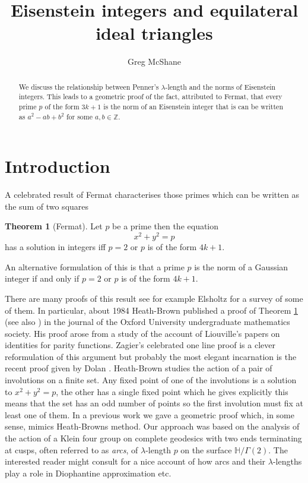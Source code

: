 \documentclass[12pt]{amsart}
\title{Eisenstein integers and equilateral ideal triangles}
\author[McShane]{Greg McShane}
\theoremstyle{plain}
\theoremstyle{definition}
\newtheorem{thm}{Theorem}[section]
\def\HH{\mathbb{H}}
\def\xx{\HH/g2}
\def\ZZ{\mathbb{Z}}
\def\g2{\Gamma(2)}
\def\xx{\HH/\g2}
\begin{document}
\maketitle

\begin{abstract} 
We discuss the relationship between Penner's $\lambda$-length
and the norms of Eisenstein integers. This leads to a geometric
proof of the fact, attributed to Fermat, that every prime $p$ of the form $3k + 1$
is the norm of an Eisenstein integer that is can be written
as $a^2 - ab + b^2$ for some $a,b \in \ZZ$.
\end{abstract} 



\section{Introduction}


A celebrated result of Fermat characterises
those primes which can be written as the sum of two squares

\begin{thm}[Fermat]\label{main}
Let $p$ be a prime then the equation
$$x^2 + y^2 = p $$
has a solution in integers  iff  $p =2$ or $p$ is of the form $4k + 1$.
\end{thm}

An alternative formulation of this  is that
a prime $p$ is the norm of a Gaussian integer
if and only if $p =2$ or $p$ is of the form $4k + 1$.

There are many proofs of this result see for example Elsholtz
\cite{elsholtz} for a survey of some of them.
In particular, about  1984 Heath-Brown published a proof of Theorem
\ref{main} (see also \cite{aigner2})
  in the journal of the Oxford University undergraduate mathematics society. 
His proof arose from a study of the account of Liouville’s papers on
identities for parity functions. Zagier's celebrated one line proof
\cite{zagier} is a clever reformulation of this argument but
probably the most elegant incarnation is the recent proof given by
Dolan \cite{dolan}. 
Heath-Brown studies the action of a pair of involutions on a finite
set.  
Any fixed point of one of the involutions is a solution 
to $x^2 + y^2 = p$,
the other has a single fixed point which he gives explicitly
this means that the set has an odd number of points so the first
involution must fix at least one of them.
In a previous work \cite{vlad} 
we gave a geometric proof which, in some sense,
mimics Heath-Browns method.
Our approach was based on the analysis of the action of a  Klein four group 
on complete geodesics with two ends terminating at cusps, often referred to as \textit{arcs}, of
$\lambda$-length $p$ on the surface $\xx$.
The interested reader might consult \cite{springborn1, springborn2}
for a nice account of how arcs and their $\lambda$-lengths
play a role in Diophantine approximation etc.
\end{document}
